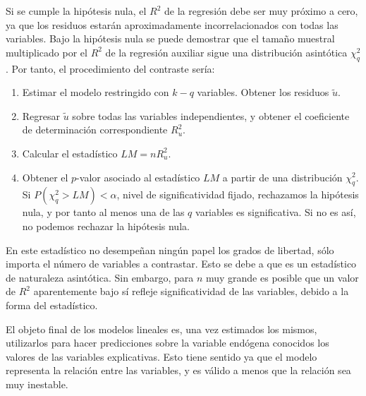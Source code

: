 Si se cumple la hip\'otesis nula, el $R^2$ de la regresi\'on debe ser muy pr\'oximo a cero, ya que los residuos estar\'an aproximadamente incorrelacionados con todas las variables. Bajo la hip\'otesis nula se puede demostrar que el tama\~no muestral multiplicado por el $R^2$ de la regresi\'on auxiliar sigue una distribuci\'on asint\'otica $\chi^2_q$. Por tanto, el procedimiento del contraste ser\'ia:
\begin{enumerate}
\item Estimar el modelo restringido con $k-q$ variables. Obtener los residuos $\tilde{u}$.
\item Regresar $\tilde{u}$ sobre todas las variables independientes, y obtener el coeficiente de determinaci\'on correspondiente $R^2_u$.
\item Calcular el estad\'istico $LM=nR^2_u$.
\item Obtener el $p$-valor asociado al estad\'istico $LM$ a partir de una distribuci\'on $\chi^2_q$. Si $P(\chi^2_q>LM)<\alpha$, nivel de significatividad fijado, rechazamos la hip\'otesis nula, y por tanto al menos una de las $q$ variables es significativa. Si no es as\'i, no podemos rechazar la hip\'otesis nula.
\end{enumerate}

En este estad\'istico no desempe\~nan ning\'un papel los grados de libertad, s\'olo importa el n\'umero de variables a contrastar. Esto se debe a que es un estad\'istico de naturaleza asint\'otica. Sin embargo, para $n$ muy grande es posible que un valor de $R^2$ aparentemente bajo s\'i refleje significatividad de las variables, debido a la forma del estad\'istico.


El objeto final de los modelos lineales es, una vez estimados los
mismos, utilizarlos para hacer predicciones sobre la variable end\'ogena
conocidos los valores de las variables explicativas. Esto tiene sentido
ya que el modelo representa la relaci\'on entre las variables, y es
v\'alido a menos que la relaci\'on sea muy inestable.



